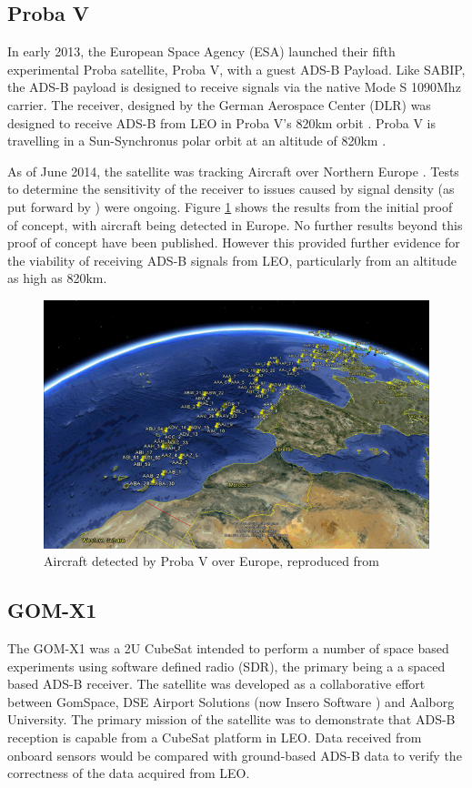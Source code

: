 \subsection{Proba V}
In early 2013, the European Space Agency (ESA) launched their fifth experimental Proba satellite, Proba V, with a guest ADS-B Payload. Like SABIP, the ADS-B payload is designed to receive signals via the native Mode S 1090Mhz carrier. The receiver, designed by the German Aerospace Center (DLR) was designed to receive ADS-B from LEO in Proba V's 820km orbit \cite{DLR,TheEur,T}. Proba V is travelling in a Sun-Synchronus polar orbit at an altitude of 820km \cite{TheEur}.  

As of June 2014, the satellite was tracking Aircraft over Northern Europe \cite{DLR}. Tests to determine the sensitivity of the receiver to issues caused by signal density (as put forward by \cite{Blomenhofer2012}) were ongoing. Figure \ref{fig:probav_planes} shows the results from the initial proof of concept, with aircraft being detected in Europe\cite{TheEur}. No further results beyond this proof of concept have been published. However this provided further evidence for the viability of receiving ADS-B signals from LEO, particularly from an altitude as high as 820km.
\begin{figure}[H]
	\centering
	\includegraphics[scale = 0.5]{Pictures/probav_planes.jpg}
	
	\caption[Aircraft detected by Proba V over Europe]{Aircraft detected by Proba V over Europe, reproduced from \cite{TheEur}}
	\label{fig:probav_planes}
\end{figure}

\subsection{GOM-X1} \label{sec:gomx}
The GOM-X1 was a 2U CubeSat intended to perform a number of space based experiments using software defined radio (SDR), the primary being a a spaced based ADS-B receiver. The satellite was developed as a collaborative effort between GomSpace, DSE Airport Solutions (now Insero Software \cite{Insero2014}) and Aalborg University. The primary mission of the satellite was to demonstrate that ADS-B reception is capable from a CubeSat platform in LEO. Data received from onboard sensors would be compared with ground-based ADS-B data to verify the correctness of the data acquired from LEO\cite{GomSpace2014,Alminde2012}.

